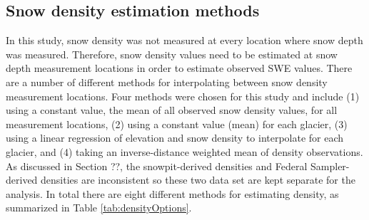\documentclass[12pt]{article}
\begin{document}
\subsection{Snow density estimation methods}

In this study, snow density was not measured at every location where snow depth was measured. Therefore, snow density values need to be estimated at snow depth measurement locations in order to estimate observed SWE values. There are a number of different methods for interpolating between snow density measurement locations. Four methods were chosen for this study and include (1) using a constant value, the mean of all observed snow density values, for all measurement locations, (2) using a constant value (mean) for each glacier, (3) using a linear regression of elevation and snow density to interpolate for each glacier, and (4) taking an inverse-distance weighted mean of density observations. As discussed in Section ??, the snowpit-derived densities and Federal Sampler-derived densities are inconsistent so these two data set are kept separate for the analysis. In total there are eight different methods for estimating density, as summarized in Table \ref{tab:densityOptions}.
\end{document}
